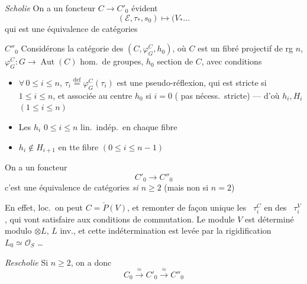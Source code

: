\documentclass[11pt,a4paper]{article}
\begin{document}

\emph{Scholie} On a un foncteur $C \to C'_0$ évident
\[
(\mathcal{E}, \tau_{*}, s_0) \longmapsto (V_{*} \ldots
\]
qui est une équivalence de catégories

$\boxed{C''_0}$ \struck{\ill{}} Considérons la catégorie des
\struck{\ill{}}  $(C, \varphi^{C}_{G}, h_0)$, où $C$ est un
fibré projectif de rg $n$, $\varphi^{C}_{G} : G \to \operatorname{Aut}(C)$
hom.\ de groupes, $h_0$ section de $C$, avec conditions
\begin{itemize}
\item[1)] $\forall\, 0 \leq i \leq n$, $\tau_i \overset{\mathrm{def}}{=}
\varphi^{C}_{G}(\tau_i)$ est une pseudo-réflexion, qui est stricte si
$1 \leq i \leq n$, et associée au centre $h_0$ si $i = 0$ (\struck{\ill{}} pas
nécess.\ stricte) — d'où $h_i, H_i$ $(1 \leq i \leq n)$
\item[2)] Les $h_i$ $0 \leq i \leq n$ lin.\ indép.\ en chaque fibre
\item[3)] $h_i \notin H_{i+1}$ en tte fibre \quad $(0 \leq i \leq n-1)$
\end{itemize}

On a un foncteur
\[
C'_0 \longrightarrow C''_0
\]
c'est une équivalence de catégories \emph{si $n \geq 2$} (mais non si
$n = 2$)

En effet, loc.\ on peut  $C = \check{P}(V)$, et
remonter de façon unique  les
\ $\tau^{C}_{i}$ en des \ $\tau^{V}_{i}$,
qui vont satisfaire aux  conditions de commutation. Le
module $V$ est déterminé modulo $\otimes L$, $L$ inv., et cette
indétermination est levée par la rigidification $L_0 \simeq \mathcal{O}_S$
\ldots
{}

\emph{ Rescholie}  Si $n \geq 2$, on a donc
\[
C_0 \xrightarrow{\ \approx\ } C'_0 \xrightarrow{\ \approx\ } C''_0
\]
\end{document}
